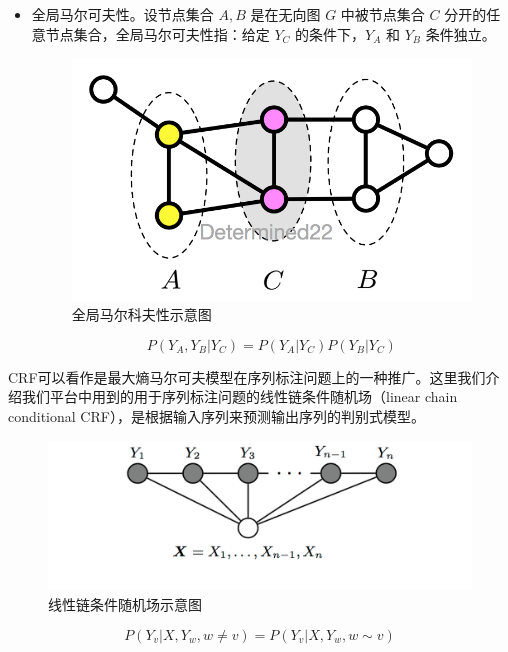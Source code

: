\begin{itemize}
	\item 全局马尔可夫性。设节点集合 $A,B$ 是在无向图 $G$ 中被节点集合 $C$ 分开的任意节点集合，全局马尔可夫性指：给定 $Y_C$ 的条件下，$Y_A$ 和 $Y_B$ 条件独立。
	\begin{figure}[ht]
		\centering
		\includegraphics[width=\linewidth/2]{figures/Markov3.png}
		\caption{全局马尔科夫性示意图}
    	\label{fig:Markov3}
	\end{figure}
	\begin{equation}
		P\left(Y_{A}, Y_{B} | Y_{C}\right)=P\left(Y_{A} | Y_{C}\right) P\left(Y_{B} | Y_{C}\right)
	\end{equation}
\end{itemize}

CRF可以看作是最大熵马尔可夫模型在序列标注问题上的一种推广。这里我们介绍我们平台中用到的用于序列标注问题的线性链条件随机场（linear chain conditional CRF），是根据输入序列来预测输出序列的判别式模型。
	\begin{figure}[ht]
		\centering
		\includegraphics[width=\linewidth]{figures/linear_chain_CRF.png}
		\caption{线性链条件随机场示意图}
    	\label{fig:Markov3}
	\end{figure}

\begin{equation}
P\left(Y_{v} | X, Y_{w}, w \neq v\right)=P\left(Y_{v} | X, Y_{w}, w \sim v\right)
\label{CRF_11}
\end{equation}

